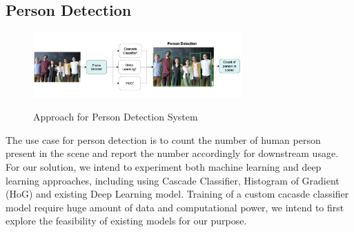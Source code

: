 \documentclass{article}
\begin{document}
\subsection{Person Detection}
\begin{figure}[tbh]
    \begin{center}
        \includegraphics[width=8cm]{person-detection.png}\
        \caption{Approach for Person Detection System \label{figure2}} 
    \end{center}
\end{figure}

The use case for person detection is to count the number of human person present in the scene and report the number accordingly for downstream usage. For our solution, we intend to experiment both machine learning and deep learning approaches, including using Cascade Classifier, Histogram of Gradient (HoG) and existing Deep Learning model. Training of a custom cacasde classifier model require huge amount of data and computational power, we intend to first explore the feasibility of existing models for our purpose.
\end{document}
